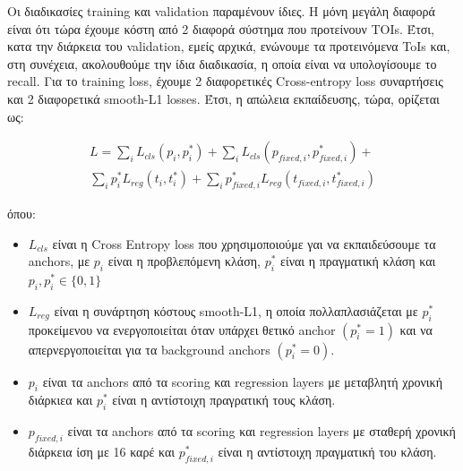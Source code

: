 \documentclass{report}
\begin{document}
\par
Οι διαδικασίες training και validation παραμένουν ίδιες. Η μόνη μεγάλη διαφορά είναι ότι τώρα έχουμε κόστη  από 2 διαφορά σύστημα που προτείνουν TOIs. Έτσι, κατα την διάρκεια του validation,
εμείς αρχικά, ενώνουμε τα προτεινόμενα ToIs και, στη συνέχεια, ακολουθούμε την ίδια διαδικασία, η οποία είναι να υπολογίσουμε το recall. Για το training loss, έχουμε 2 διαφορετικές
Cross-entropy loss συναρτήσεις και 2 διαφορετικά smooth-L1 losses. Έτσι, η απώλεια εκπαίδευσης, τώρα, ορίζεται ως:





\begin{equation} 
\begin{split}
 L  =  \sum_iL_{cls}(p_i, p_i^*) + \sum_iL_{cls}(p_{fixed,i}, p_{fixed,i}^*) + \\
   \sum_ip_i^*L_{reg}(t_i,t_i^*) + \sum_ip_{fixed,i}^*L_{reg}(t_{fixed,i},t_{fixed,i}^*) 
\end{split}
\end{equation}

όπου:
\begin{itemize}
  \item $L_{cls} $ είναι η Cross Entropy loss που χρησιμοποιούμε γαι να εκπαιδεύσουμε τα anchors, με $p_i$ είναι η προβλεπόμενη κλάση, $p_i^*$ είναι η πραγματική κλάση και
  $p_i, p_i^* \in \{0,1\}$
\item $L_{reg} $ είναι η συνάρτηση κόστους smooth-L1, η οποία πολλαπλασιάζεται με $p_i^*$ προκείμενου να ενεργοποιείται όταν υπάρχει θετικό anchor $(p_i^* = 1)$
  και να απερνεργοποιείται για τα background anchors $(p_i^* = 0)$.
\item $p_i $ είναι τα anchors από τα scoring και regression layers με μεταβλητή χρονική διάρκιεα και  $p_i^*$ είναι η αντίστοιχη πραγρατική τους κλάση.
\item $p_{fixed,i} $ είναι τα anchors από τα scoring και regression layers με σταθερή χρονική διάρκεια ίση με 16 καρέ και $p_{fixed,i}^*$ είναι η αντίστοιχη πραγματική του κλάση.

\end{itemize}
\end{document}
